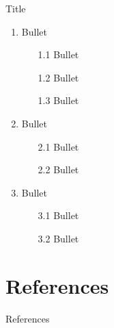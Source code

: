 \documentclass[8pt, aspectratio=169]{beamer} %
\begin{document}
\begin{frame}{Title}
    \begin{enumerate}
        \pause
        \item Bullet
            \begin{enumerate}
                \pause
                \item[1.1] Bullet
                \pause
                \item[1.2] Bullet
                \pause
                \item[1.3] Bullet
            \end{enumerate}
        \pause
        \item Bullet
            \begin{enumerate}
                \pause
                \item[2.1] Bullet
                \pause
                \item[2.2] Bullet
            \end{enumerate}
        \pause
        \item Bullet
            \begin{enumerate}
                \pause
                \item[3.1] Bullet
                \pause
                \item[3.2] Bullet
            \end{enumerate}
        \end{enumerate}
\end{frame}

\section{References}

\begin{frame}[allowframebreaks]{References}
    \printbibliography[heading=none]
\end{frame}
\end{document}
